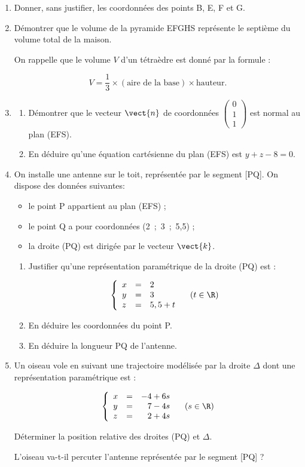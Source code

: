 \begin{enumerate}
\item Donner, sans justifier, les coordonnées des points B, E, F et G.
\item Démontrer que le volume de la pyramide EFGHS représente le septième du volume total de la maison.

On rappelle que le volume $V$ d'un tétraèdre est donné par la formule :

\[V = \dfrac13 \times (\text{aire de la base}) \times  \text{hauteur}.\]
\item 
	\begin{enumerate}
		\item Démontrer que le vecteur $\vect{n}$ de coordonnées $\begin{pmatrix}0\\1\\1\end{pmatrix}$ est normal au plan (EFS).
		\item En déduire qu'une équation cartésienne du plan (EFS) est $y + z - 8 = 0$.
	\end{enumerate}	
\item On installe une antenne sur le toit, représentée par le segment [PQ]. On dispose des données suivantes:

\begin{itemize}
\item[$\bullet~~$] le point P appartient au plan (EFS) ;
\item[$\bullet~~$] le point Q a pour coordonnées (2~;~3~;~5,5) ;
\item[$\bullet~~$] la droite (PQ) est dirigée par le vecteur $\vect{k}$.
\end{itemize}
	\begin{enumerate}
		\item Justifier qu'une représentation paramétrique de la droite (PQ) est :

\[\left\{\begin{array}{l c l}
x &=&2\\
y &=&3\\
z &=& 5,5 + t
\end{array}\right. \quad (t \in \R)\]
		\item En déduire les coordonnées du point P.
		\item En déduire la longueur PQ de l'antenne.
	\end{enumerate}	
\item Un oiseau vole en suivant une trajectoire modélisée par la droite $\Delta$ dont une représentation paramétrique est :

\[\left\{\begin{array}{l c r}
x & =& -4 +6s\\ y &=& 7 - 4s\\z &=& 2 + 4s
\end{array}\right.\quad (s \in \R)\]

Déterminer la position relative des droites (PQ) et $\Delta$.

L'oiseau va-t-il percuter l'antenne représentée par le segment [PQ] ?

\end{enumerate}

\bigskip
